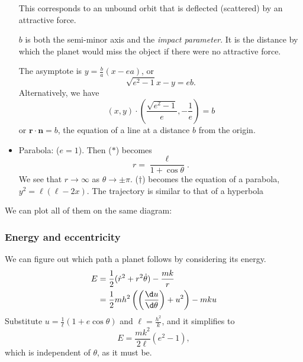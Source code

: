 \documentclass[a4paper]{article}
\begin{document}
\begin{itemize}
    \begin{center}
    \end{center}

    This corresponds to an unbound orbit that is deflected (scattered) by an attractive force.

    $b$ is both the semi-minor axis and the \emph{impact parameter}. It is the distance by which the planet would miss the object if there were no attractive force.

    The asymptote is $y = \frac{b}{a}(x - ea)$, or
    \[
      \sqrt{e^2 - 1} x - y = eb.
    \]
    Alternatively, we have
    \[
      (x, y) \cdot \left(\frac{\sqrt{e^2 - 1}}{e}, -\frac{1}{e}\right) = b
    \]
    or $\mathbf{r} \cdot \mathbf{n} = b$, the equation of a line at a distance $b$ from the origin.

  \item Parabola: ($e = 1$). Then ($*$) becomes
    \[
      r = \frac{\ell}{1 + \cos \theta}.
    \]
    We see that $r\to \infty$ as $\theta \to \pm \pi$. ($\dagger$) becomes the equation of a parabola, $y^2 = \ell(\ell - 2x)$. The trajectory is similar to that of a hyperbola
\end{itemize}

We can plot all of them on the same diagram:

\subsubsection{Energy and eccentricity}
We can figure out which path a planet follows by considering its energy.
\begin{align*}
  E &= \frac{1}{2}(\dot{r}^2 + r^2\dot{\theta}) - \frac{mk}{r}\\
  &= \frac{1}{2}mh^2\left(\left(\frac{\d u}{\d \theta}\right) + u^2\right) - mku
\end{align*}
Substitute $\displaystyle u = \frac{1}{\ell}(1 + e\cos \theta)$ and $\displaystyle \ell = \frac{h^2}{k}$, and it simplifies to
\[
  E = \frac{mk^2}{2\ell}(e^2 - 1),
\]
which is independent of $\theta$, as it must be.
\end{document}
